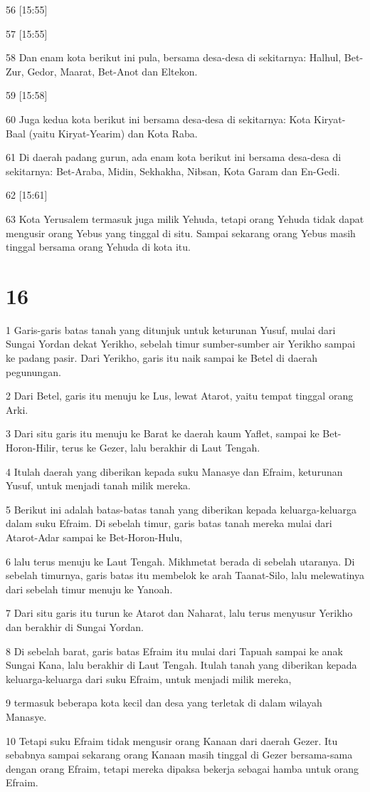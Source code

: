 \par 56 [15:55]
\par 57 [15:55]
\par 58 Dan enam kota berikut ini pula, bersama desa-desa di sekitarnya: Halhul, Bet-Zur, Gedor, Maarat, Bet-Anot dan Eltekon.
\par 59 [15:58]
\par 60 Juga kedua kota berikut ini bersama desa-desa di sekitarnya: Kota Kiryat-Baal (yaitu Kiryat-Yearim) dan Kota Raba.
\par 61 Di daerah padang gurun, ada enam kota berikut ini bersama desa-desa di sekitarnya: Bet-Araba, Midin, Sekhakha, Nibsan, Kota Garam dan En-Gedi.
\par 62 [15:61]
\par 63 Kota Yerusalem termasuk juga milik Yehuda, tetapi orang Yehuda tidak dapat mengusir orang Yebus yang tinggal di situ. Sampai sekarang orang Yebus masih tinggal bersama orang Yehuda di kota itu.

\chapter{16}

\par 1 Garis-garis batas tanah yang ditunjuk untuk keturunan Yusuf, mulai dari Sungai Yordan dekat Yerikho, sebelah timur sumber-sumber air Yerikho sampai ke padang pasir. Dari Yerikho, garis itu naik sampai ke Betel di daerah pegunungan.
\par 2 Dari Betel, garis itu menuju ke Lus, lewat Atarot, yaitu tempat tinggal orang Arki.
\par 3 Dari situ garis itu menuju ke Barat ke daerah kaum Yaflet, sampai ke Bet-Horon-Hilir, terus ke Gezer, lalu berakhir di Laut Tengah.
\par 4 Itulah daerah yang diberikan kepada suku Manasye dan Efraim, keturunan Yusuf, untuk menjadi tanah milik mereka.
\par 5 Berikut ini adalah batas-batas tanah yang diberikan kepada keluarga-keluarga dalam suku Efraim. Di sebelah timur, garis batas tanah mereka mulai dari Atarot-Adar sampai ke Bet-Horon-Hulu,
\par 6 lalu terus menuju ke Laut Tengah. Mikhmetat berada di sebelah utaranya. Di sebelah timurnya, garis batas itu membelok ke arah Taanat-Silo, lalu melewatinya dari sebelah timur menuju ke Yanoah.
\par 7 Dari situ garis itu turun ke Atarot dan Naharat, lalu terus menyusur Yerikho dan berakhir di Sungai Yordan.
\par 8 Di sebelah barat, garis batas Efraim itu mulai dari Tapuah sampai ke anak Sungai Kana, lalu berakhir di Laut Tengah. Itulah tanah yang diberikan kepada keluarga-keluarga dari suku Efraim, untuk menjadi milik mereka,
\par 9 termasuk beberapa kota kecil dan desa yang terletak di dalam wilayah Manasye.
\par 10 Tetapi suku Efraim tidak mengusir orang Kanaan dari daerah Gezer. Itu sebabnya sampai sekarang orang Kanaan masih tinggal di Gezer bersama-sama dengan orang Efraim, tetapi mereka dipaksa bekerja sebagai hamba untuk orang Efraim.

